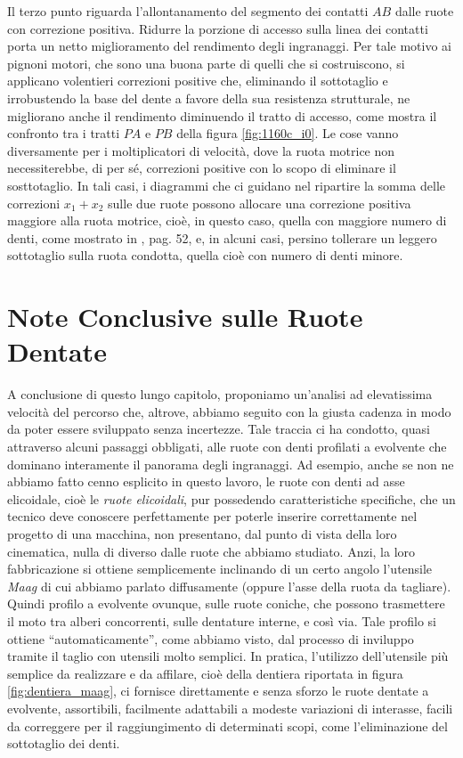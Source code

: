 \noindent Il terzo punto riguarda l'allontanamento del segmento dei
 contatti $AB$ dalle ruote con correzione positiva. Ridurre la porzione
di accesso sulla linea dei contatti porta un netto
miglioramento del rendimento degli ingranaggi. Per tale motivo ai pignoni
motori, che sono una buona parte di quelli che si costruiscono, si applicano
volentieri correzioni positive che, eliminando il sottotaglio e irrobustendo
la base del dente a favore della sua resistenza strutturale, ne migliorano anche
il rendimento diminuendo il tratto di accesso, come mostra il confronto
tra i tratti $PA$ e $PB$ della figura \ref{fig:1160c_i0}.
Le cose vanno diversamente per i moltiplicatori di velocit\`a, dove la ruota
motrice non necessiterebbe, di per s\'e, correzioni positive con lo scopo
di eliminare il sosttotaglio. In tali casi, i diagrammi che ci guidano
nel ripartire la somma delle correzioni $x_1+x_2$ sulle due ruote possono
allocare una correzione positiva maggiore alla ruota motrice, cio\`e,
in questo caso, quella con maggiore numero di denti, come mostrato
in \cite{righettini}, pag. 52, e, in alcuni casi, persino 
tollerare un leggero
sottotaglio sulla ruota condotta, quella cio\`e con numero di denti minore.

\section{Note Conclusive sulle Ruote Dentate}

A conclusione di questo lungo capitolo, proponiamo un'analisi
ad elevatissima
 velocit\`a del percorso che, altrove, abbiamo seguito con la giusta
cadenza in modo da poter essere sviluppato senza incertezze. Tale traccia
ci ha condotto, quasi attraverso alcuni passaggi obbligati, alle ruote
con denti profilati a evolvente che dominano
interamente il panorama degli ingranaggi. Ad esempio, anche se non
ne abbiamo fatto cenno esplicito in questo lavoro, le ruote con denti ad asse
elicoidale, cio\`e le {\em ruote elicoidali},
 pur possedendo caratteristiche specifiche, che un tecnico
deve conoscere perfettamente per poterle inserire correttamente 
nel progetto di una macchina, non
presentano, dal punto di vista della loro cinematica, nulla di diverso
dalle ruote che abbiamo studiato. Anzi, la loro fabbricazione si ottiene
semplicemente inclinando di un certo angolo l'utensile {\em Maag} di cui abbiamo
parlato diffusamente (oppure l'asse della ruota da tagliare).
Quindi profilo a evolvente ovunque, sulle ruote
coniche, che possono trasmettere il moto tra alberi concorrenti, sulle dentature
interne, e cos\`i via. Tale profilo si ottiene ``automaticamente'', come abbiamo visto,
dal processo di inviluppo tramite il taglio con utensili molto semplici.
In pratica, l'utilizzo dell'utensile pi\`u semplice da realizzare e da
affilare, cio\`e della dentiera riportata in figura
\ref{fig:dentiera_maag},
 ci fornisce direttamente e senza sforzo le ruote dentate a evolvente,
assortibili, facilmente adattabili a modeste variazioni di interasse,
facili da correggere per il raggiungimento di determinati scopi, come
l'eliminazione del sottotaglio dei denti.

